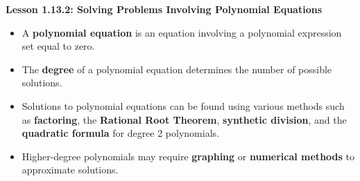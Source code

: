 \begin{center}
\textbf{Lesson 1.13.2: Solving Problems Involving Polynomial Equations}
\end{center}

\vspace*{-1.5ex}

\begin{itemize}
    \item A \textbf{polynomial equation} is an equation involving a polynomial expression set equal to zero.
    \item The \textbf{degree} of a polynomial equation determines the number of possible solutions.
    \item Solutions to polynomial equations can be found using various methods such as \textbf{factoring}, the \textbf{Rational Root Theorem}, \textbf{synthetic division}, and the \textbf{quadratic formula} for degree 2 polynomials.
    \item Higher-degree polynomials may require \textbf{graphing} or \textbf{numerical methods} to approximate solutions.
\end{itemize}
